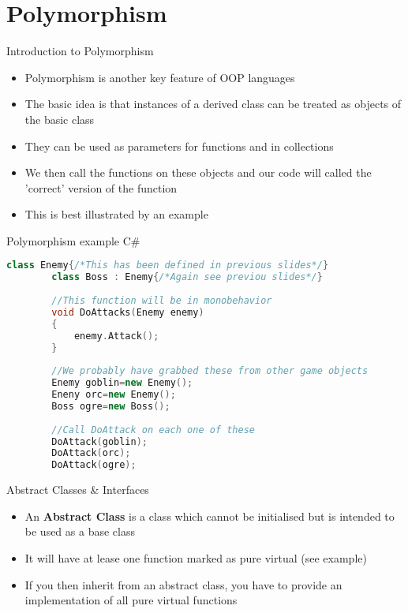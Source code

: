 \part{Polymorphism}
\frame{\partpage}

\begin{frame}{Introduction to Polymorphism}
	\begin{itemize}
		\pause \item Polymorphism is another key feature of OOP languages
		\pause \item The basic idea is that instances of a derived class can be treated as objects of the basic class
		\pause \item They can be used as parameters for functions and in collections
		\pause \item We then call the functions on these objects and our code will called the 'correct' version of the function
		\pause \item This is best illustrated by an example 
	\end{itemize}
\end{frame}

\begin{frame}[fragile]{Polymorphism example C\#}
		\begin{lstlisting}[language=C++,basicstyle=\tiny,]
		class Enemy{/*This has been defined in previous slides*/}
		class Boss : Enemy{/*Again see previou slides*/}
		
		//This function will be in monobehavior
		void DoAttacks(Enemy enemy)
		{
			enemy.Attack();
		}
		
		//We probably have grabbed these from other game objects
		Enemy goblin=new Enemy();
		Eneny orc=new Enemy();
		Boss ogre=new Boss();
		
		//Call DoAttack on each one of these
		DoAttack(goblin);
		DoAttack(orc);
		DoAttack(ogre);
		\end{lstlisting}
\end{frame}


\begin{frame}{Abstract Classes \& Interfaces}
\begin{itemize}
	\pause \item An \textbf{Abstract Class} is a class which cannot be initialised but is intended to be used as a base class
	\pause \item It will have at lease one function marked as pure virtual (see example)
	\pause \item If you then inherit from an abstract class, you have to provide an implementation of all pure virtual functions
\end{itemize}
\end{frame}

